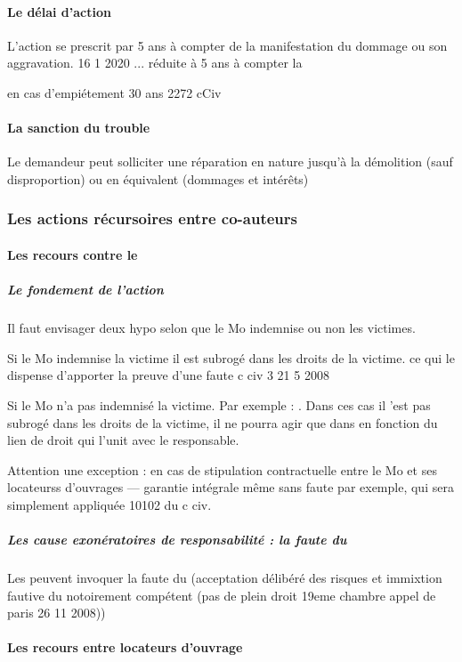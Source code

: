 			\paragraph{Le délai d'action} L'action se prescrit par 5 ans à compter de la manifestation du dommage ou son aggravation. 16 1 2020 ... réduite à 5 ans à compter la

			en cas d'empiétement 30 ans 2272 cCiv

			\paragraph{La sanction du trouble} Le demandeur peut solliciter une réparation en nature jusqu'à la démolition (sauf disproportion) ou en équivalent (dommages et intérêts)

		\subsubsection{Les actions récursoires entre co-auteurs}

			\paragraph{Les recours contre le \lo}

				\subparagraph{Le fondement de l'action} Il faut envisager deux hypo selon que le Mo indemnise ou non les victimes.

					Si le Mo indemnise la victime il est subrogé dans les droits de la victime. ce qui le dispense d'apporter la preuve d'une faute c civ 3 21 5 2008

					Si le Mo n'a pas indemnisé la victime. Par exemple : . Dans ces cas il 'est pas subrogé dans les droits de la victime, il ne pourra agir que dans en fonction du lien de droit qui l'unit avec le responsable.

					Attention une exception : en cas de stipulation contractuelle entre le Mo et ses locateurss d'ouvrages --- garantie intégrale même sans faute par exemple, qui sera simplement appliquée 10102 du c civ.

				\subparagraph{Les cause exonératoires de responsabilité : la faute du \Mo}

					Les peuvent invoquer la faute du (acceptation délibéré des risques et immixtion fautive du \Mo notoirement compétent (pas de plein droit 19eme chambre  appel de paris 26 11 2008))

			\paragraph{Les recours entre locateurs d'ouvrage}

